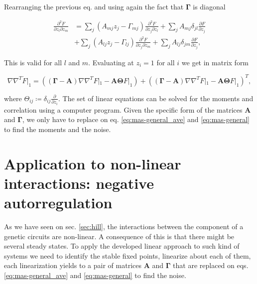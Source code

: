 Rearranging the previous eq. and using again the fact that $\mathbf{\Gamma}$ is diagonal

\begin{equation*}
  \begin{split}
    \frac{\partial^2\dot{F}}{\partial z_l \partial z_m} &= \sum_j\left(A_{mj}z_j-\Gamma_{mj}\right)\frac{\partial^2F}{\partial z_j\partial z_l} + \sum_jA_{mj}\delta_{jl}\frac{\partial F}{\partial z_j}\\
    &+\sum_j\left(A_{lj}z_j-\Gamma_{lj}\right)\frac{\partial^2F}{\partial z_j\partial z_m} + \sum_jA_{lj}\delta_{jm}\frac{\partial F}{\partial z_j},
  \end{split}
\end{equation*}

This is valid for all $l$ and $m$. Evaluating at $z_i=1$ for all $i$ we get in matrix form

\begin{equation}
  \label{eq:mas-general}
  \nabla\nabla^T\dot{F}|_1 = \left(\left(\mathbf{\Gamma} - \mathbf{A}\right)\nabla\nabla^TF|_1 - \mathbf{A}\mathbf{\Theta} F|_1\right)+\left(\left(\mathbf{\Gamma} - \mathbf{A}\right)\nabla\nabla^TF|_1 - \mathbf{A}\mathbf{\Theta} F|_1\right)^T,
\end{equation}

where $\Theta_{ij} \coloneqq \delta_{ij}\frac{\partial}{\partial z_i}$. The set of linear equations can be solved for the moments and correlation using a computer program. Given the specific form of the matrices $\mathbf{A}$ and $\mathbf{\Gamma}$, we only have to replace on eq. \eqref{eq:mas-general_ave} and \eqref{eq:mas-general} to find the moments and the noise.

\section{Application to non-linear interactions: negative autorregulation}
\label{sec:mas-neg_autorreg}

As we have seen on sec. \ref{sec:hill}, the interactions between the component of a genetic circuits are non-linear. A consequence of this is that there might be several steady states. To apply the developed linear approach to such kind of systems we need to identify the stable fixed points, linearize about each of them, each linearization yields to a pair of matrices $\mathbf{A}$ and $\mathbf{\Gamma}$  that are replaced on eqs. \eqref{eq:mas-general_ave} and \eqref{eq:mas-general} to find the noise.


